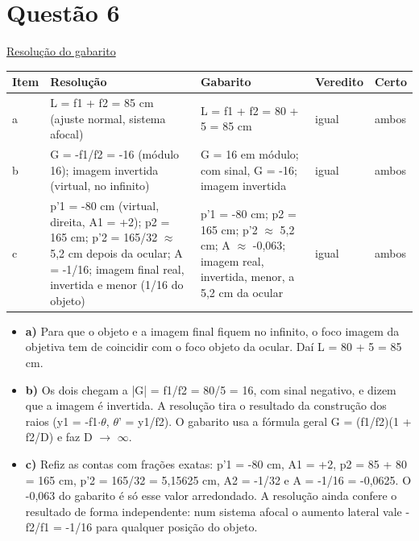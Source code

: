 \documentclass{article}%
\begin{document}
\section*{Questão 6}%
\href{https://poliedroresolve.sistemapoliedro.com.br/vestibulares/ita/2026/ita-2-fase-dia-3-30-10-2025-2-fase-dia-3/dissertativa-6-fisica-2-fase-dia-3-ita-2026}{Resolução do gabarito}\par\smallskip%
\begin{longtable}{@{}p{} p{} p{} p{} p{}@{}}\toprule Item & Resolução & Gabarito & Veredito & Certo \\ \midrule
a & L = f1 + f2 = 85 cm (ajuste normal, sistema afocal) & L = f1 + f2 = 80 + 5 = 85 cm & igual & ambos \\
b & G = -f1/f2 = -16 (módulo 16); imagem invertida (virtual, no infinito) & G = 16 em módulo; com sinal, G = -16; imagem invertida & igual & ambos \\
c & p'1 = -80 cm (virtual, direita, A1 = +2); p2 = 165 cm; p'2 = 165/32 $\approx$ 5,2 cm depois da ocular; A = -1/16; imagem final real, invertida e menor (1/16 do objeto) & p'1 = -80 cm; p2 = 165 cm; p'2 $\approx$ 5,2 cm; A $\approx$ -0,063; imagem real, invertida, menor, a 5,2 cm da ocular & igual & ambos \\
\bottomrule\end{longtable}%
\begin{itemize}%
\item%
\textbf{a)} Para que o objeto e a imagem final fiquem no infinito, o foco imagem da objetiva tem de coincidir com o foco objeto da ocular. Daí L = 80 + 5 = 85 cm.%
\item%
\textbf{b)} Os dois chegam a |G| = f1/f2 = 80/5 = 16, com sinal negativo, e dizem que a imagem é invertida. A resolução tira o resultado da construção dos raios (y1 = -f1$\cdot$$\theta$, $\theta$' = y1/f2). O gabarito usa a fórmula geral G = (f1/f2)(1 + f2/D) e faz D $\to$ $\infty$.%
\item%
\textbf{c)} Refiz as contas com frações exatas: p'1 = -80 cm, A1 = +2, p2 = 85 + 80 = 165 cm, p'2 = 165/32 = 5,15625 cm, A2 = -1/32 e A = -1/16 = -0,0625. O -0,063 do gabarito é só esse valor arredondado. A resolução ainda confere o resultado de forma independente: num sistema afocal o aumento lateral vale -f2/f1 = -1/16 para qualquer posição do objeto.%
\end{itemize}%
\end{document}

